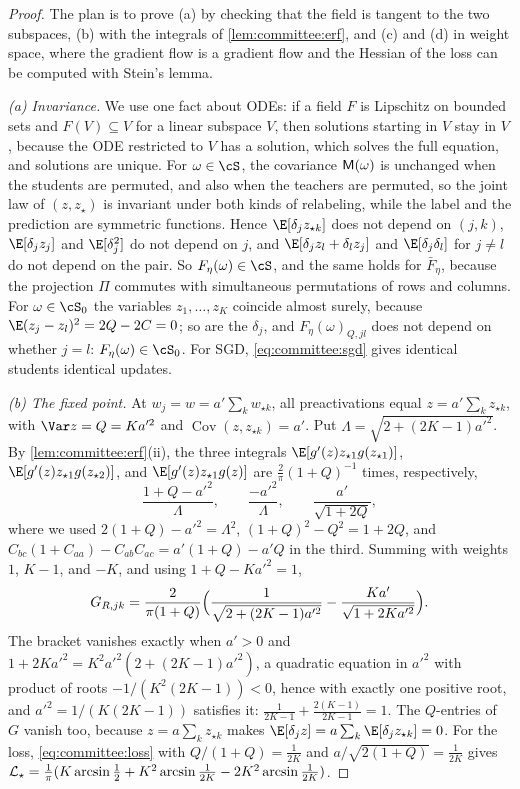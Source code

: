 \begin{refsection}
\begin{proof}
The plan is to prove (a) by checking that the field is tangent to the two subspaces, (b) with the integrals of \cref{lem:committee:erf}, and (c) and (d) in weight space, where the gradient flow is a gradient flow and the Hessian of the loss can be computed with Stein's lemma.

\emph{(a) Invariance.} We use one fact about ODEs: if a field $F$ is Lipschitz on bounded sets and $F(V)\subseteq V$ for a linear subspace $V$, then solutions starting in $V$ stay in $V$, because the ODE restricted to $V$ has a solution, which solves the full equation, and solutions are unique. For $\omega\in\cS$, the covariance $\mathsf{M}(\omega)$ is unchanged when the students are permuted, and also when the teachers are permuted, so the joint law of $(z,z_\star)$ is invariant under both kinds of relabeling, while the label and the prediction are symmetric functions. Hence $\E[\delta_jz_{\star k}]$ does not depend on $(j,k)$, $\E[\delta_jz_j]$ and $\E[\delta_j^2]$ do not depend on $j$, and $\E[\delta_jz_l+\delta_lz_j]$ and $\E[\delta_j\delta_l]$ for $j\ne l$ do not depend on the pair. So $F_\eta(\omega)\in\cS$, and the same holds for $\bar F_\eta$, because the projection $\Pi$ commutes with simultaneous permutations of rows and columns. For $\omega\in\cS_0$ the variables $z_1,\dots,z_K$ coincide almost surely, because $\E(z_j-z_l)^2=2Q-2C=0$; so are the $\delta_j$, and $F_\eta(\omega)_{Q,jl}$ does not depend on whether $j=l$: $F_\eta(\omega)\in\cS_0$. For SGD, \eqref{eq:committee:sgd} gives identical students identical updates.

\emph{(b) The fixed point.} At $w_j=w=a'\sum_kw_{\star k}$, all preactivations equal $z=a'\sum_kz_{\star k}$, with $\Var z=Q=Ka'^2$ and $\operatorname{Cov}(z,z_{\star k})=a'$. Put $\Lambda=\sqrt{2+(2K-1)a'^2}$. By \cref{lem:committee:erf}(ii), the three integrals $\E[g'(z)z_{\star1}g(z_{\star1})]$, $\E[g'(z)z_{\star1}g(z_{\star2})]$, and $\E[g'(z)z_{\star1}g(z)]$ are $\frac2\pi(1+Q)^{-1}$ times, respectively,
\[
  \frac{1+Q-a'^2}{\Lambda},\qquad\frac{-a'^2}{\Lambda},\qquad\frac{a'}{\sqrt{1+2Q}},
\]
where we used $2(1+Q)-a'^2=\Lambda^2$, $(1+Q)^2-Q^2=1+2Q$, and $C_{bc}(1+C_{aa})-C_{ab}C_{ac}=a'(1+Q)-a'Q$ in the third. Summing with weights $1$, $K-1$, and $-K$, and using $1+Q-Ka'^2=1$,
\[
  G_{R,jk}=\frac{2}{\pi(1+Q)}\Bigl(\frac1{\sqrt{2+(2K-1)a'^2}}-\frac{Ka'}{\sqrt{1+2Ka'^2}}\Bigr).
\]
The bracket vanishes exactly when $a'>0$ and $1+2Ka'^2=K^2a'^2(2+(2K-1)a'^2)$, a quadratic equation in $a'^2$ with product of roots $-1/(K^2(2K-1))<0$, hence with exactly one positive root, and $a'^2=1/(K(2K-1))$ satisfies it: $\frac{1}{2K-1}+\frac{2(K-1)}{2K-1}=1$. The $Q$-entries of $G$ vanish too, because $z=a\sum_kz_{\star k}$ makes $\E[\delta_jz]=a\sum_k\E[\delta_jz_{\star k}]=0$. For the loss, \eqref{eq:committee:loss} with $Q/(1+Q)=\frac1{2K}$ and $a/\sqrt{2(1+Q)}=\frac1{2K}$ gives $\mathcal{L}_\star=\frac1\pi(K\arcsin\frac12+K^2\arcsin\frac1{2K}-2K^2\arcsin\frac1{2K})$.


\end{proof}
\end{refsection}
